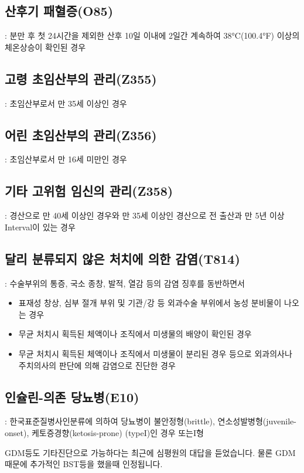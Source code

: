 \subsection*{산후기 패혈증(O85)} : 분만 후 첫 24시간을 제외한 산후 10일 이내에 2일간 계속하여 38°C(100.4°F) 이상의 체온상승이 확인된 경우
\subsection*{고령 초임산부의 관리(Z355)} : 초임산부로서 만 35세 이상인 경우 \label{oldprimi} 
\subsection*{어린 초임산부의 관리(Z356)} : 초임산부로서 만 16세 미만인 경우 \label{youngprimi} 
\subsection*{기타 고위험 임신의 관리(Z358)} : 경산으로 만 40세 이상인 경우와 만 35세 이상인 경산으로 전 출산과 만 5년 이상 Interval이 있는 경우 \label{otherhigh} 
\subsection*{달리 분류되지 않은 처치에 의한 감염(T814)} : 수술부위의 통증, 국소 종창, 발적, 열감 등의 감염 징후를 동반하면서
\begin{itemize}\tightlist
\item 표재성 창상, 심부 절개 부위 및 기관/강 등 외과수술 부위에서 농성 분비물이 나오는 경우
\item 무균 처치시 획득된 체액이나 조직에서 미생물의 배양이 확인된 경우
\item 무균 처치시 획득된 체액이나 조직에서 미생물이 분리된 경우 등으로 외과의사나 주치의사의 판단에 의해 감염으로 진단한 경우
\end{itemize}

\subsection*{인슐린-의존 당뇨병(E10)} : 한국표준질병사인분류에 의하여 당뇨병이 불안정형(brittle), 연소성발병형(juvenile-onset), 케토증경향(ketosis-prone) (typeI)인 경우 또는I형
\begin{shaded}
GDM등도 기타진단으로 가능하다는 최근에 심평원의 대답을 듣었습니다. 물론 GDM때문에 추가적인 BST등을 했을때 인정됩니다.
\end{shaded}
\clearpage

